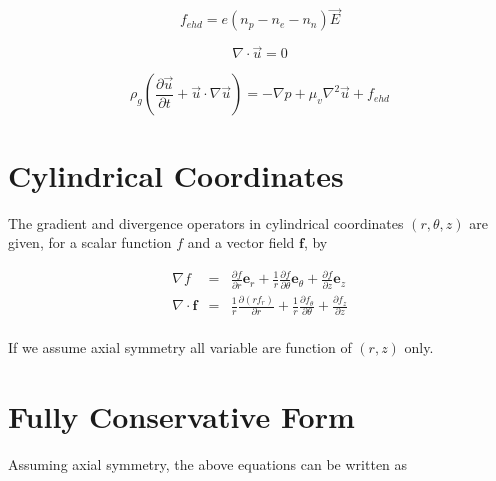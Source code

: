 \documentclass[12pt, a4paper]{report}
\newcommand{\be}{{\bm e}}
\begin{document}
\begin{equation}
    f_{ehd} = e(n_p -n_e-n_n) \vec{E}
\end{equation}

\begin{equation}
    \nabla \cdot \vec{u} = 0
\end{equation}

\begin{equation}
    \rho_g \left( \frac{\partial \vec{u}}{\partial t} + \vec{u}\cdot\nabla\vec{u}  \right) = -\nabla p + \mu_v\nabla^2\vec{u} + f_{ehd}
\end{equation}

\section{Cylindrical Coordinates}

The gradient and divergence operators in cylindrical coordinates $(r,\theta,z)$ are given, for a scalar function $f$ and a vector field ${\bm f}$, by

\[
\begin{array}{rcl}
\nabla f  & = & \displaystyle \frac{\partial f}{\partial r} \be_r +  \frac{1}{r} \frac{\partial f}{\partial \theta} \be_{\theta} + \frac{\partial f}{\partial z} \be_z \\[2ex]
\nabla \cdot {\bm f}   & = & \displaystyle \frac{1}{r} \frac{\partial  (r f_r)}{\partial r}  +  \frac{1}{r}  \frac{\partial    f_\theta}{\partial \theta}  +  \frac{\partial f_z}{\partial z} \\[2ex]
\end{array}
\]

\noindent
If we assume axial symmetry all variable are function of $(r,z)$ only.

\section{ Fully Conservative Form}

Assuming axial symmetry, the above equations can be written as 
\end{document}
